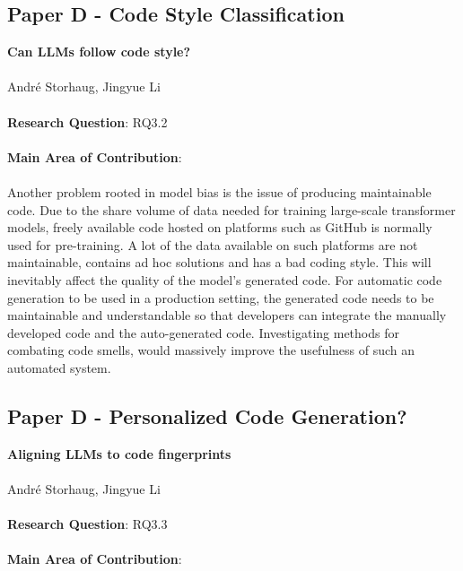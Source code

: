 \documentclass{article}
\begin{document}
\subsection{Paper D - Code Style Classification}

\textbf{Can LLMs follow code style?}\\\\
\noindent Andr\'e Storhaug, Jingyue Li\\\\
\noindent \textbf{Research Question}: RQ3.2\\\\
\noindent \textbf{Main Area of Contribution}: \\\\

Another problem rooted in model bias is the issue of producing maintainable code. Due to the share volume of data needed for training large-scale transformer models, freely available code hosted on platforms such as GitHub is normally used for pre-training. A lot of the data available on such platforms are not maintainable, contains ad hoc solutions and has a bad coding style. This will inevitably affect the quality of the model's generated code. For automatic code generation to be used in a production setting, the generated code needs to be maintainable and understandable so that developers can integrate the manually developed code and the auto-generated code. Investigating methods for combating code smells, would massively improve the usefulness of such an automated system.



\subsection{Paper D - Personalized Code Generation?}

\textbf{Aligning LLMs to code fingerprints}\\\\
\noindent Andr\'e Storhaug, Jingyue Li\\\\
\noindent \textbf{Research Question}: RQ3.3\\\\
\noindent \textbf{Main Area of Contribution}: \\\\
\end{document}
